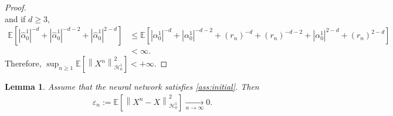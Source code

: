 \documentclass[11pt,a4paper,reqno]{amsart}
\numberwithin{equation}{section}
\theoremstyle{plain}
\newtheorem{lemma}[theorem]{Lemma}
\theoremstyle{definition}
\def\e{{\varepsilon}}
\newcommand{\E}{\mathbb{E}}
\newcommand{\cH}{\mathcal{H}}
\newcommand{\norm}[1]{\left\|#1 \right\|} %
\newcommand{\abs}[1]{\left|#1\right|} %
\begin{document}
\begin{proof}
\[\]
and if $d \ge 3$,
\begin{align*}
\E \left[ \abs{\hat\alpha_0^1}^{-d} + \abs{\hat\alpha_0^1}^{-d-2} + \abs{\hat\alpha_0^1}^{2-d} \right] 
    &\le \E \left[ \abs{\alpha_0^1}^{-d} + \abs{\alpha_0^1}^{-d-2} + \left(r_n\right)^{-d} + \left(r_n\right)^{-d-2} + \abs{\alpha_0^1}^{2-d}+\left(r_n\right)^{2-d} \right] \\
    &< \infty.
\end{align*}
Therefore, $\sup_{n \ge 1} \E \left[ \norm{X^n}^2_{\cH_0^1} \right] < + \infty.$
\end{proof}

\begin{lemma}
\label{lem:epN}
Assume that the neural network satisfies \cref{ass:initial}.
Then
\begin{align*}
    \e_n := \E \left[ \norm{X^n - X}_{\cH_0^1}^2 \right] \xrightarrow[n\to\infty]{} 0.
\end{align*}
\end{lemma}
\end{document}
